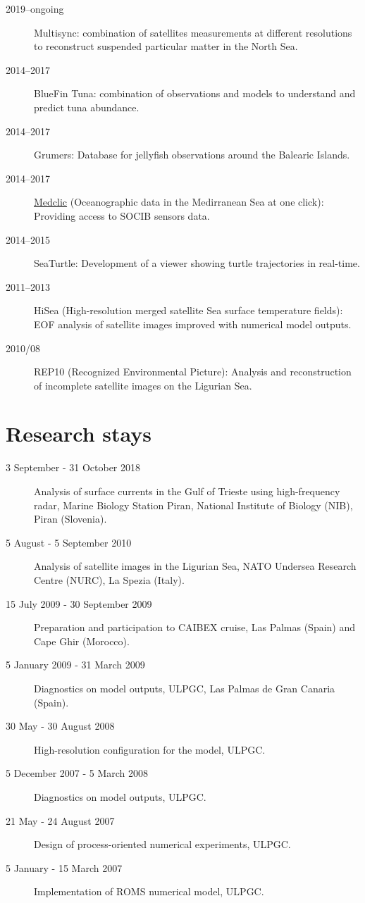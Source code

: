 \documentclass[11pt,a4paper,svgnames]{article}
\begin{document}
\begin{description}
\item[2019--ongoing] Multisync: combination of satellites measurements at different resolutions to reconstruct suspended particular matter in the North Sea.
\item[2014--2017] BlueFin Tuna: combination of observations and models to understand and predict tuna abundance.
\item[2014--2017] Grumers: Database for jellyfish observations around the Balearic Islands. 
\item[2014--2017] \href{http://medclic.es/es/news/research/asimilacion-datos.html}{Medclic} (Oceanographic data in the Medirranean Sea at one click): Providing access to SOCIB sensors data.
\item[2014--2015] SeaTurtle: Development of a viewer showing turtle trajectories in real-time.
\item[2011--2013] HiSea (High-resolution merged satellite Sea surface temperature fields): EOF analysis of satellite images improved with numerical model outputs.
\item[2010/08] REP10 (Recognized Environmental Picture): Analysis and reconstruction of incomplete satellite images on the Ligurian Sea.
\end{description}

\section{Research stays}

\begin{description}
\item[3 September - 31 October 2018] Analysis of surface currents in the Gulf of Trieste using high-frequency radar, Marine Biology Station Piran, National Institute of Biology (NIB), Piran (Slovenia).
\item[5 August - 5 September 2010] Analysis of satellite images in the Ligurian Sea, NATO Undersea Research Centre (NURC), La Spezia (Italy). 
\item[15 July 2009 - 30 September 2009] Preparation and participation to CAIBEX cruise, Las Palmas (Spain) and Cape Ghir (Morocco). 
\item[5 January 2009 - 31 March 2009] Diagnostics on model outputs, ULPGC, Las Palmas de Gran Canaria (Spain).
\item[30 May - 30 August 2008] High-resolution configuration for the model, ULPGC.
\item[5 December 2007 - 5 March 2008] Diagnostics on model outputs, ULPGC.
\item[21 May - 24 August 2007] Design of process-oriented numerical experiments, ULPGC.
\item[5 January - 15 March 2007] Implementation of ROMS numerical model, ULPGC.
\end{description}
\end{document}
